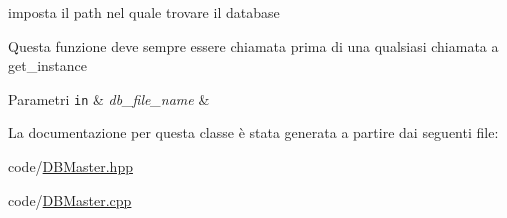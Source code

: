 imposta il path nel quale trovare il database 

Questa funzione deve sempre essere chiamata prima di una qualsiasi chiamata a get\+\_\+instance 
\begin{DoxyParams}[1]{Parametri}
\mbox{\tt in}  & {\em db\+\_\+file\+\_\+name} & \\
\hline
\end{DoxyParams}


La documentazione per questa classe è stata generata a partire dai seguenti file\+:\begin{DoxyCompactItemize}
\item 
code/\hyperlink{_d_b_master_8hpp}{D\+B\+Master.\+hpp}\item 
code/\hyperlink{_d_b_master_8cpp}{D\+B\+Master.\+cpp}\end{DoxyCompactItemize}
